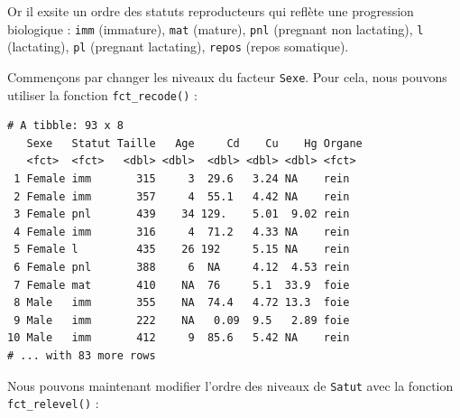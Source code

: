 \documentclass[
  a4paper,
]{article}
\newenvironment{Shaded}{\begin{snugshade}}{\end{snugshade}}
\newcommand{\DataTypeTok}[1]{\textcolor[rgb]{0.00,0.34,0.68}{#1}}
\newcommand{\KeywordTok}[1]{\textcolor[rgb]{0.12,0.11,0.11}{\textbf{#1}}}
\newcommand{\NormalTok}[1]{\textcolor[rgb]{0.12,0.11,0.11}{#1}}
\newcommand{\OperatorTok}[1]{\textcolor[rgb]{0.12,0.11,0.11}{#1}}
\newcommand{\StringTok}[1]{\textcolor[rgb]{0.75,0.01,0.01}{#1}}
\begin{document}
Or il exsite un ordre des statuts reproducteurs qui reflète une progression biologique :
\texttt{imm} (immature), \texttt{mat} (mature), \texttt{pnl} (pregnant non lactating), \texttt{l} (lactating), \texttt{pl} (pregnant lactating), \texttt{repos} (repos somatique).

Commençons par changer les niveaux du facteur \texttt{Sexe}. Pour cela, nous pouvons utiliser la fonction \texttt{fct\_recode()} :

\begin{Shaded}
\end{Shaded}

\begin{verbatim}
# A tibble: 93 x 8
   Sexe   Statut Taille   Age     Cd    Cu    Hg Organe
   <fct>  <fct>   <dbl> <dbl>  <dbl> <dbl> <dbl> <fct> 
 1 Female imm       315     3  29.6   3.24 NA    rein  
 2 Female imm       357     4  55.1   4.42 NA    rein  
 3 Female pnl       439    34 129.    5.01  9.02 rein  
 4 Female imm       316     4  71.2   4.33 NA    rein  
 5 Female l         435    26 192     5.15 NA    rein  
 6 Female pnl       388     6  NA     4.12  4.53 rein  
 7 Female mat       410    NA  76     5.1  33.9  foie  
 8 Male   imm       355    NA  74.4   4.72 13.3  foie  
 9 Male   imm       222    NA   0.09  9.5   2.89 foie  
10 Male   imm       412     9  85.6   5.42 NA    rein  
# ... with 83 more rows
\end{verbatim}

Nous pouvons maintenant modifier l'ordre des niveaux de \texttt{Satut} avec la fonction \texttt{fct\_relevel()} :

\begin{Shaded}
\end{Shaded}
\end{document}
